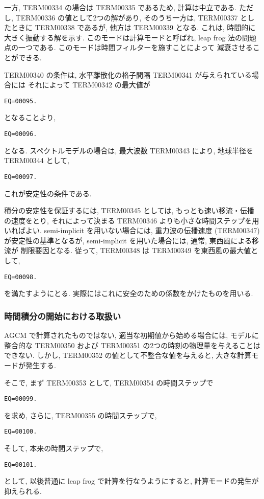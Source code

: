 一方, TERM00334 の場合は TERM00335 であるため,
計算は中立である.
ただし, TERM00336 の値として2つの解があり,
そのうち一方は, TERM00337 としたときに
TERM00338 であるが, 
他方は TERM00339 となる.
これは, 時間的に大きく振動する解を示す.
このモードは計算モードと呼ばれ, 
leap frog 法の問題点の一つである.
このモードは時間フィルターを施すことによって
減衰させることができる.

TERM00340 の条件は,
水平離散化の格子間隔 TERM00341 が与えられている場合には
それによって TERM00342 の最大値が
\begin{verbatim}
EQ=00095.
\end{verbatim}
となることより,
\begin{verbatim}
EQ=00096.
\end{verbatim}
となる.
スペクトルモデルの場合は, 最大波数 TERM00343 により,
地球半径を TERM00344 として,
\begin{verbatim}
EQ=00097.
\end{verbatim}
これが安定性の条件である.

積分の安定性を保証するには,
TERM00345 としては, もっとも速い移流・伝播の速度をとり,
それによって決まる TERM00346 よりも小さな時間ステップを用いればよい.
semi-implicit を用いない場合には, 重力波の伝播速度
(TERM00347) が安定性の基準となるが,
semi-implicit を用いた場合には, 通常, 東西風による移流が
制限要因となる.
従って, TERM00348 は TERM00349 を東西風の最大値として,
\begin{verbatim}
EQ=00098.
\end{verbatim}
を満たすようにとる.
実際にはこれに安全のための係数をかけたものを用いる.

\subsubsection{時間積分の開始における取扱い}

AGCM で計算されたものではない, 
適当な初期値から始める場合には, モデルに整合的な
TERM00350 および TERM00351 の2つの時刻の物理量を与えることはできない.
しかし, TERM00352 の値として不整合な値を与えると,
大きな計算モードが発生する.

そこで, まず TERM00353 として, TERM00354 の時間ステップで
\begin{verbatim}
EQ=00099.
\end{verbatim}
を求め, さらに, TERM00355 の時間ステップで,
\begin{verbatim}
EQ=00100.
\end{verbatim}
そして, 本来の時間ステップで,
\begin{verbatim}
EQ=00101.
\end{verbatim}
として, 以後普通に leap frog で計算を行なうようにすると,
計算モードの発生が抑えられる.
